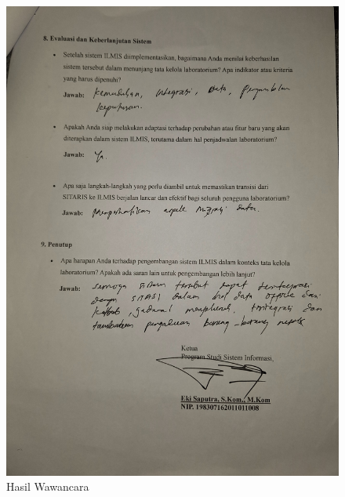 \begin{figure}[h]
	\centering
	\includegraphics[width=0.82\linewidth]{konten/gambar/wawancara/5.jpg}
	\caption{Hasil Wawancara}
	\label{fig:hasil-wawancara}
\end{figure}

